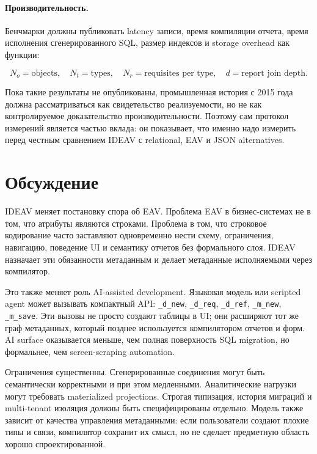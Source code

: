 \documentclass[11pt]{article}
\begin{document}
\paragraph{Производительность.}
Бенчмарки должны публиковать latency записи, время компиляции отчета, время
исполнения сгенерированного SQL, размер индексов и storage overhead как функции:

\[
  N_o = \text{objects},\quad
  N_t = \text{types},\quad
  N_r = \text{requisites per type},\quad
  d = \text{report join depth}.
\]

Пока такие результаты не опубликованы, промышленная история с 2015 года должна
рассматриваться как свидетельство реализуемости, но не как контролируемое
доказательство производительности. Поэтому сам протокол измерений является
частью вклада: он показывает, что именно надо измерить перед честным сравнением
IDEAV с relational, EAV и JSON alternatives.

\section{Обсуждение}

IDEAV меняет постановку спора об EAV. Проблема EAV в бизнес-системах не в том,
что атрибуты являются строками. Проблема в том, что строковое кодирование часто
заставляют одновременно нести схему, ограничения, навигацию, поведение UI и
семантику отчетов без формального слоя. IDEAV назначает эти обязанности
метаданным и делает метаданные исполняемыми через компилятор.

Это также меняет роль AI-assisted development. Языковая модель или scripted
agent может вызывать компактный API: \texttt{\_d\_new}, \texttt{\_d\_req},
\texttt{\_d\_ref}, \texttt{\_m\_new}, \texttt{\_m\_save}. Эти вызовы не просто
создают таблицы в UI; они расширяют тот же граф метаданных, который позднее
используется компилятором отчетов и форм. AI surface оказывается меньше, чем
полная поверхность SQL migration, но формальнее, чем screen-scraping automation.

Ограничения существенны. Сгенерированные соединения могут быть семантически
корректными и при этом медленными. Аналитические нагрузки могут требовать
materialized projections. Строгая типизация, история миграций и multi-tenant
изоляция должны быть специфицированы отдельно. Модель также зависит от
качества управления метаданными: если пользователи создают плохие типы и связи,
компилятор сохранит их смысл, но не сделает предметную область хорошо
спроектированной.
\end{document}
